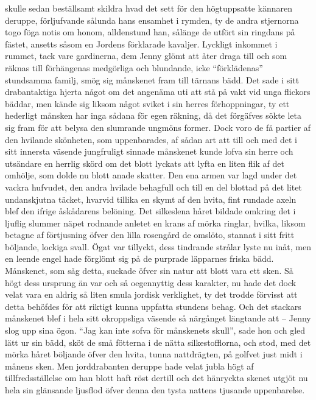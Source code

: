 skulle sedan beställsamt skildra hvad det sett för den högtuppsatte
kännaren deruppe, förljufvande sålunda hans ensamhet i rymden, ty de
andra stjernorna togo föga notis om honom, alldenstund han, sålänge de
utfört sin ringdans på fästet, ansetts såsom en Jordens förklarade
kavaljer. Lyckligt inkommet i rummet, tack vare gardinerna, dem Jenny
glömt att åter draga till och som räknas till förhängenas medgörliga och
blundande, icke ``förklädenas'' stundsamma familj, smög sig månskenet
fram till tärnans bädd. Det sade i sitt drabantaktiga hjerta något om
det angenäma uti att stå på vakt vid unga flickors bäddar, men kände sig
liksom något sviket i sin herres förhoppningar, ty ett hederligt månsken
har inga sådana för egen räkning, då det förgäfves sökte leta sig fram
för att belysa den slumrande ungmöns former. Dock voro de få partier af
den hvilande skönheten, som uppenbarades, af sådan art att till och med
det i sitt innersta väsende jungfruligt sinnade månskenet kunde lofva
sin herre och utsändare en herrlig skörd om det blott lyckats att lyfta
en liten flik af det omhölje, som dolde nu blott anade skatter. Den ena
armen var lagd under det vackra hufvudet, den andra hvilade behagfull
och till en del blottad på det litet undanskjutna täcket, hvarvid
tillika en skymt af den hvita, fint rundade axeln blef den ifrige
åskådarens belöning. Det silkeslena håret bildade omkring det i ljuflig
slummer näpet rodnande anletet en krans af mörka ringlar, hvilka, liksom
betagne af förtjusning öfver den lilla rosengård de omslöto, stannat i
sitt fritt böljande, lockiga svall. Ögat var tillyckt, dess tindrande
strålar lyste nu inåt, men en leende engel hade förglömt sig på de
purprade läpparnes friska bädd. Månskenet, som såg detta, suckade öfver
sin natur att blott vara ett sken. Så högt dess ursprung än var och så
oegennyttig dess karakter, nu hade det dock velat vara en aldrig så
liten smula jordisk verklighet, ty det trodde förvisst att detta
behöfdes för att riktigt kunna uppfatta stundens behag. Och det stackars
månskenet blef i hela sitt okroppsliga väsende så närgånget längtande
att -- Jenny slog upp sina ögon. ``Jag kan inte sofva för månskenets
skull'', sade hon och gled lätt ur sin bädd, sköt de små fötterna i de
nätta silkestofflorna, och stod, med det mörka håret böljande öfver den
hvita, tunna nattdrägten, på golfvet just midt i månens sken. Men
jorddrabanten deruppe hade velat jubla högt af tillfredsställelse om han
blott haft röst dertill och det hänryckta skenet utgjöt nu hela sin
glänsande ljusflod öfver denna den tysta nattens tjusande uppenbarelse.

